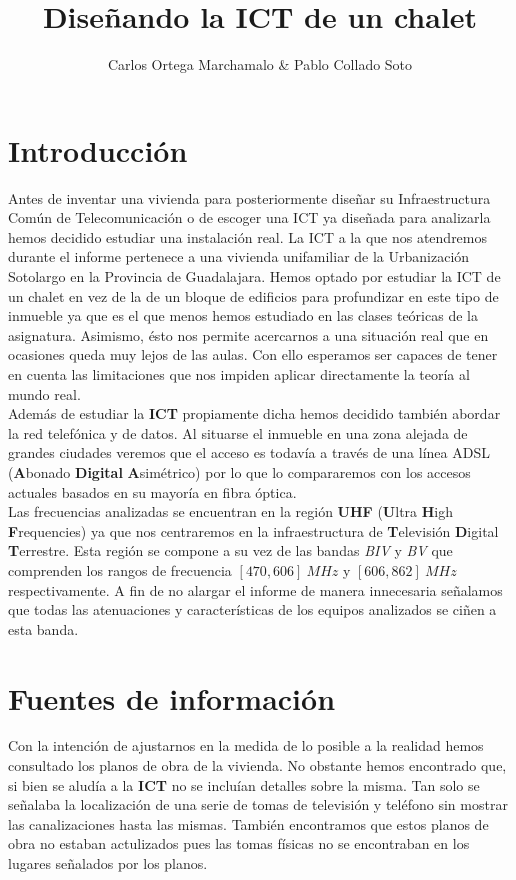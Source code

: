 \documentclass{article}[12 pt]
\title{Diseñando la ICT de un chalet}
\author{Carlos Ortega Marchamalo \& Pablo Collado Soto}
\date{}
\begin{document}
	\maketitle

	\section{Introducción}
		Antes de inventar una vivienda para posteriormente diseñar su Infraestructura Común de Telecomunicación o de escoger una ICT ya diseñada para analizarla hemos decidido estudiar una instalación real. La ICT a la que nos atendremos durante el informe pertenece a una vivienda unifamiliar de la Urbanización Sotolargo en la Provincia de Guadalajara. Hemos optado por estudiar la ICT de un chalet en vez de la de un bloque de edificios para profundizar en este tipo de inmueble ya que es el que menos hemos estudiado en las clases teóricas de la asignatura. Asimismo, ésto nos permite acercarnos a una situación real que en ocasiones queda muy lejos de las aulas. Con ello esperamos ser capaces de tener en cuenta las limitaciones que nos impiden aplicar directamente la teoría al mundo real.\\

		Además de estudiar la \textbf{ICT} propiamente dicha hemos decidido también abordar la red telefónica y de datos. Al situarse el inmueble en una zona alejada de grandes ciudades veremos que el acceso es todavía a través de una línea ADSL (\textbf{A}bonado \textbf{Digital} \textbf{A}simétrico) por lo que lo compararemos con los accesos actuales basados en su mayoría en fibra óptica.\\

		Las frecuencias analizadas se encuentran en la región \textbf{UHF} (\textbf{U}ltra \textbf{H}igh \textbf{F}requencies) ya que nos centraremos en la infraestructura de \textbf{T}elevisión \textbf{D}igital \textbf{T}errestre. Esta región se compone a su vez de las bandas \textit{BIV} y \textit{BV} que comprenden los rangos de frecuencia $[470, 606]\ MHz$ y $[606, 862]\ MHz$ respectivamente. A fin de no alargar el informe de manera innecesaria señalamos que todas las atenuaciones y características de los equipos analizados se ciñen a esta banda.\\

	\section{Fuentes de información}
		Con la intención de ajustarnos en la medida de lo posible a la realidad hemos consultado los planos de obra de la vivienda. No obstante hemos encontrado que, si bien se aludía a la \textbf{ICT} no se incluían detalles sobre la misma. Tan solo se señalaba la localización de una serie de tomas de televisión y teléfono sin mostrar las canalizaciones hasta las mismas. También encontramos que estos planos de obra no estaban actulizados pues las tomas físicas no se encontraban en los lugares señalados por los planos.\\
\end{document}
